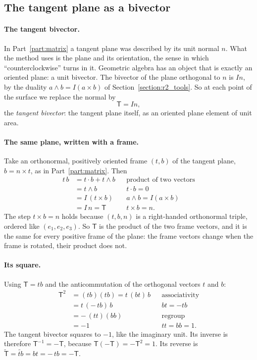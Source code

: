 \subsection{The tangent plane as a bivector}
\label{section:ga_plane}

\paragraph{The tangent bivector.} In Part~\ref{part:matrix} a tangent plane was described by its unit normal $n$. What the method uses is the plane and its orientation, the sense in which ``counterclockwise'' turns in it. Geometric algebra has an object that is exactly an oriented plane: a unit bivector. The bivector of the plane orthogonal to $n$ is $I n$, by the duality $a\wedge b = I(a\times b)$ of Section~\ref{section:r2_tools}. So at each point of the surface we replace the normal by
\begin{equation}
\label{eqn:ga_T}
\mathsf T = I n ,
\end{equation}
the \emph{tangent bivector}: the tangent plane itself, as an oriented plane element of unit area.

\paragraph{The same plane, written with a frame.} Take an orthonormal, positively oriented frame $(t, b)$ of the tangent plane, $b = n\times t$, as in Part~\ref{part:matrix}. Then
\begin{align*}
t\, b &= t\cdot b + t\wedge b && \text{product of two vectors} \\
&= t\wedge b && t\cdot b = 0 \\
&= I\,(t\times b) && a\wedge b = I(a\times b) \\
&= I\, n = \mathsf T && t\times b = n .
\end{align*}
The step $t\times b = n$ holds because $(t, b, n)$ is a right-handed orthonormal triple, ordered like $(e_1, e_2, e_3)$. So $\mathsf T$ is the product of the two frame vectors, and it is the same for every positive frame of the plane: the frame vectors change when the frame is rotated, their product does not.

\paragraph{Its square.} Using $\mathsf T = tb$ and the anticommutation of the orthogonal vectors $t$ and $b$:
\begin{align*}
\mathsf T^2 &= (t b)(t b) = t\,(b t)\, b && \text{associativity} \\
&= t\,(-\,t b)\, b && bt = -tb \\
&= -\,(t t)(b b) && \text{regroup} \\
&= -1 && tt = bb = 1 .
\end{align*}
The tangent bivector squares to $-1$, like the imaginary unit. Its inverse is therefore $\mathsf T^{-1} = -\mathsf T$, because $\mathsf T(-\mathsf T) = -\mathsf T^2 = 1$. Its reverse is $\widetilde{\mathsf T} = \widetilde{tb} = bt = -\,tb = -\mathsf T$.

